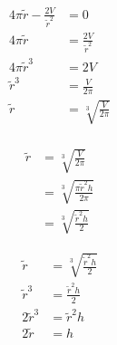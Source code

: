 \documentclass[12pt]{article}
\begin{document}
\vspace{10mm}

\begin{minipage}[t]{\textwidth}
\begin{mdframed}[linewidth=0.5mm, backgroundcolor=cyan!10]
\begin{align*}
4\pi \tilde{r} - \frac{2V}{\tilde{r}^{2}} &= 0 \\
4\pi \tilde{r} &= \frac{2V}{\tilde{r}^{2}} \\
4\pi \tilde{r}^3 &= 2V \\
\tilde{r}^3 &= \frac{V}{2\pi} \\
\tilde{r} &= \sqrt[3]{\frac{V}{2\pi}} \\
\end{align*}
\end{mdframed}
\end{minipage}

\vspace{10mm}

\begin{minipage}[t]{\textwidth}
\begin{mdframed}[linewidth=0.5mm, backgroundcolor=cyan!10]
\begin{align*}
\tilde{r} &= \sqrt[3]{\frac{V}{2\pi}} \\
&= \sqrt[3]{\frac{\pi \tilde{r}^2 h}{2\pi}} \\
&= \sqrt[3]{\frac{\tilde{r}^2 h}{2}}
\end{align*}
\end{mdframed}
\end{minipage}

\vspace{10mm}

\begin{minipage}[t]{\textwidth}
\begin{mdframed}[linewidth=0.5mm, backgroundcolor=cyan!10]
\begin{align*}
\tilde{r} &= \sqrt[3]{\frac{\tilde{r}^2 h}{2}} \\
\tilde{r}^3 &= \frac{\tilde{r}^2 h}{2} \\
2\tilde{r}^3 &= \tilde{r}^2 h \\
2\tilde{r} &= h \\
\end{align*}
\end{mdframed}
\end{minipage}
\end{document}
